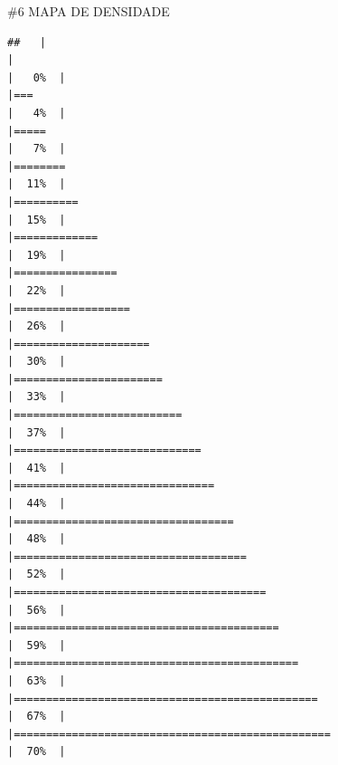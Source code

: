 \documentclass[
]{book}
\theoremstyle{definition}
\theoremstyle{definition}
\theoremstyle{definition}
\theoremstyle{definition}
\theoremstyle{remark}
\begin{document}
\#6 MAPA DE DENSIDADE

\begin{verbatim}
##   |                                                                              |                                                                      |   0%  |                                                                              |===                                                                   |   4%  |                                                                              |=====                                                                 |   7%  |                                                                              |========                                                              |  11%  |                                                                              |==========                                                            |  15%  |                                                                              |=============                                                         |  19%  |                                                                              |================                                                      |  22%  |                                                                              |==================                                                    |  26%  |                                                                              |=====================                                                 |  30%  |                                                                              |=======================                                               |  33%  |                                                                              |==========================                                            |  37%  |                                                                              |=============================                                         |  41%  |                                                                              |===============================                                       |  44%  |                                                                              |==================================                                    |  48%  |                                                                              |====================================                                  |  52%  |                                                                              |=======================================                               |  56%  |                                                                              |=========================================                             |  59%  |                                                                              |============================================                          |  63%  |                                                                              |===============================================                       |  67%  |                                                                              |=================================================                     |  70%  |  
\end{verbatim}
\end{document}
